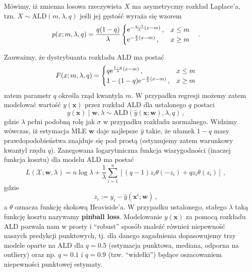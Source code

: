 \documentclass{myclass}
\numberwithin{equation}{section}
\begin{document}
\begin{definition}
Mówimy, iż zmienna losowa rzeczywista \(X\) ma asymetryczny rozkład Laplace'a, tzn. \(X \sim
\mathrm{ALD}(m, \lambda, q)\) jeśli jej gęstość wyraża się wzorem
\begin{equation*}
    p(x; m,\lambda,q) = \frac{q(1-q)}{\lambda}\begin{cases}
        \mathrm{e}^{-\frac{q-1}{\lambda} (x - m)}\,,&x \leq m\\
        \mathrm{e}^{-\frac{q}{\lambda} (x - m)}\,,&x \geq m
    \end{cases}\quad.
\end{equation*}
\end{definition}
Zauważmy, że dystrybuanta rozkładu ALD ma postać
\begin{equation}
    F(x; m,\lambda,q) = \begin{cases}
        q \mathrm{e}^{\frac{1-q}{\lambda}(x - m)}\,,&x \leq m\\
        1 - (1-q)\mathrm{e}^{-\frac{q}{\lambda}(x - m)}\,,&x \geq m
    \end{cases}
\end{equation}
zatem parametr \(q\) określa rząd kwantyla \(m\). W przypadku regresji możemy zatem modelować
wartość \(y(\mathbf{x})\) przez rozkład ALD dla ustalonego \(q\) postaci
\begin{equation}
    y(\mathbf{x}) \mid \mathbf{w}, \lambda \sim \mathrm{ALD}(\hat{y}(\mathbf{x}; \mathbf{w}), \lambda, q)\,,
\end{equation}
gdzie \(\lambda\) pełni podobną rolę jak \(\sigma\) w przypadku rozkładu normalnego. Widzimy
wówczas, iż estymacja MLE \(\mathbf{w}\) daje najlepsze \(\hat{y}\) takie, że ułamek \(1-q\) masy
prawdopodobieństwa znajduje się pod prostą (estymujemy zatem warunkowy kwantyl rzędu \(q\)).
Zanegowana logarytmiczna funkcja wiarygodności (inaczej funkcja kosztu) dla modelu ALD ma postać
\begin{equation}\boxed{
    L(\mathcal{X}; \mathbf{w}, \lambda) = n \log \lambda + \frac{1}{\lambda}\sum_{i=1}^n \left[(q-1)z_i\theta(-z_i) + qz_i\theta(z_i)\right]\,,
}\end{equation}
gdzie
\begin{equation}
    z_i := y_i - \hat{y}(\mathbf{x}^i;\mathbf{w})\,,
\end{equation}
a \(\theta\) oznacza funkcję skokową Heaviside'a. W przypadku ustalonego, stałego \(\lambda\) taką
funkcję kosztu nazywamy \textbf{pinball loss}. Modelowanie \(y(\mathbf{x})\) za pomocą rozkładu ALD
pozwala nam w prosty i \enquote{robust} sposób znaleźć również niepewność naszych predykcji
punktowych, tj. dla danego zagadnienia dopasowujemy trzy modele oparte na ALD dla \(q = 0.5\)
(estymacja punktowa, mediana, odporna na outliery) oraz np. \(q = 0.1\) i \(q = 0.9\) (tzw.
\enquote{widełki}) będące oszacowaniem niepewności punktowej estymaty. 
\end{document}

